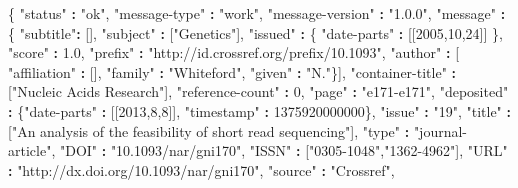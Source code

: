 \documentclass[]{krantz}
\newenvironment{Shaded}{\begin{snugshade}}{\end{snugshade}}
\newcommand{\DecValTok}[1]{\textcolor[rgb]{0.00,0.00,0.81}{#1}}
\newcommand{\FloatTok}[1]{\textcolor[rgb]{0.00,0.00,0.81}{#1}}
\newcommand{\StringTok}[1]{\textcolor[rgb]{0.31,0.60,0.02}{#1}}
\newcommand{\OperatorTok}[1]{\textcolor[rgb]{0.81,0.36,0.00}{\textbf{#1}}}
\newcommand{\NormalTok}[1]{#1}
\begin{document}
\begin{Shaded}
\begin{Highlighting}[]
\NormalTok{\{ }\StringTok{"status"} \OperatorTok{:}\StringTok{ "ok"}\NormalTok{,}
  \StringTok{"message-type"} \OperatorTok{:}\StringTok{ "work"}\NormalTok{,}
  \StringTok{"message-version"} \OperatorTok{:}\StringTok{ "1.0.0"}\NormalTok{,}
  \StringTok{"message"} \OperatorTok{:}
\StringTok{   }\NormalTok{\{ }\StringTok{"subtitle"}\OperatorTok{:}\StringTok{ }\NormalTok{[],}
     \StringTok{"subject"} \OperatorTok{:}\StringTok{ }\NormalTok{[}\StringTok{"Genetics"}\NormalTok{],}
     \StringTok{"issued"} \OperatorTok{:}\StringTok{ }\NormalTok{\{ }\StringTok{"date-parts"} \OperatorTok{:}\StringTok{ }\NormalTok{[[}\DecValTok{2005}\NormalTok{,}\DecValTok{10}\NormalTok{,}\DecValTok{24}\NormalTok{]] \},}
     \StringTok{"score"} \OperatorTok{:}\StringTok{ }\FloatTok{1.0}\NormalTok{,}
     \StringTok{"prefix"} \OperatorTok{:}\StringTok{ "http://id.crossref.org/prefix/10.1093"}\NormalTok{,}
     \StringTok{"author"} \OperatorTok{:}\StringTok{ }\NormalTok{[ }\StringTok{"affiliation"} \OperatorTok{:}\StringTok{ }\NormalTok{[],}
                   \StringTok{"family"} \OperatorTok{:}\StringTok{ "Whiteford"}\NormalTok{,}
                   \StringTok{"given"} \OperatorTok{:}\StringTok{ "N."}\NormalTok{\}],}
     \StringTok{"container-title"} \OperatorTok{:}\StringTok{ }\NormalTok{[}\StringTok{"Nucleic Acids Research"}\NormalTok{],}
     \StringTok{"reference-count"} \OperatorTok{:}\StringTok{ }\DecValTok{0}\NormalTok{,}
     \StringTok{"page"} \OperatorTok{:}\StringTok{ "e171-e171"}\NormalTok{,}
     \StringTok{"deposited"} \OperatorTok{:}\StringTok{ }\NormalTok{\{}\StringTok{"date-parts"} \OperatorTok{:}\StringTok{ }\NormalTok{[[}\DecValTok{2013}\NormalTok{,}\DecValTok{8}\NormalTok{,}\DecValTok{8}\NormalTok{]],}
                    \StringTok{"timestamp"} \OperatorTok{:}\StringTok{ }\DecValTok{1375920000000}\NormalTok{\},}
     \StringTok{"issue"} \OperatorTok{:}\StringTok{ "19"}\NormalTok{,}
     \StringTok{"title"} \OperatorTok{:}
\StringTok{       }\NormalTok{[}\StringTok{"An analysis of the feasibility of short read sequencing"}\NormalTok{],}
     \StringTok{"type"} \OperatorTok{:}\StringTok{ "journal-article"}\NormalTok{,}
     \StringTok{"DOI"} \OperatorTok{:}\StringTok{ "10.1093/nar/gni170"}\NormalTok{,}
     \StringTok{"ISSN"} \OperatorTok{:}\StringTok{ }\NormalTok{[}\StringTok{"0305-1048"}\NormalTok{,}\StringTok{"1362-4962"}\NormalTok{],}
     \StringTok{"URL"} \OperatorTok{:}\StringTok{ "http://dx.doi.org/10.1093/nar/gni170"}\NormalTok{,}
     \StringTok{"source"} \OperatorTok{:}\StringTok{ "Crossref"}\NormalTok{,}

\end{Highlighting}
\end{Shaded}
\end{document}
